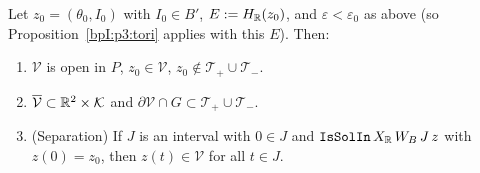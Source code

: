 \begin{proposition}\label{bpI:p5:separation}
Let $z_0=(\theta_0,I_0)$ with $I_0\in B'$, $E:=H_{\mathbb{R}}(z_0)$, and $\varepsilon<\varepsilon_0$ as above (so Proposition~\ref{bpI:p3:tori} applies with this $E$). Then:
\begin{enumerate}[label=(\alph*)]
\item $\mathcal V$ is open in $P$, $z_0\in\mathcal V$, $z_0\notin\mathcal T_+\cup\mathcal T_-$.
\item $\overline{\mathcal V}\subset\mathbb{R}^2\times\mathcal K$ and $\partial\mathcal V\cap G\subset\mathcal T_+\cup\mathcal T_-$.
\item (Separation) If $J$ is an interval with $0\in J$ and $\texttt{IsSolIn}\,X_{\mathbb{R}}\,W_B\,J\,z$ with $z(0)=z_0$, then $z(t)\in\mathcal V$ for all $t\in J$.
\end{enumerate}
\end{proposition}
